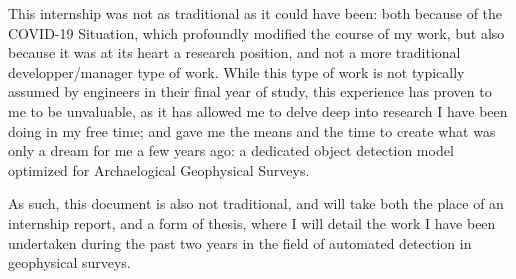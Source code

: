 This internship was not as traditional as it could have been: both because of the COVID-19 Situation, which profoundly modified the course of my work, but also because it was at its heart a research position, and not a more traditional developper/manager type of work. While this type of work is not typically assumed by engineers in their final year of study, this experience has proven to me to be unvaluable, as it has allowed me to delve deep into research I have been doing in my free time; and gave me the means and the time to create what was only a dream for me a few years ago: a dedicated object detection model optimized for Archaelogical Geophysical Surveys. 

As such, this document is also not traditional, and will take both the place of an internship report, and a form of thesis, where I will detail the work I have been undertaken during the past two years in the field of automated detection in geophysical surveys.  
